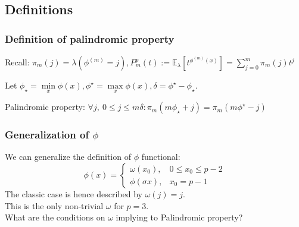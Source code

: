 \subsection{Definitions}
\begin{frame}
    \frametitle{Definition of palindromic property}
    Recall: $\pi_m(j) = \lambda(\phi^{(m)}=j),P_m^p(t):= \mathbb{E}_\lambda\left[ t^{\phi^{(m)}(x)}\right] = \sum\limits_{j=0}^m \pi_m(j) t^j$
    
    Let $\phi_\star = \min\limits_x \phi(x), \phi^\star = \max\limits_x \phi(x), \delta=\phi^\star - \phi_\star$.
    
     Palindromic property: $\forall j,\ 0 \le j \le m\delta:   \pi_m(m\phi_\star + j)=\pi_m(m\phi^\star-j)$
\end{frame}

\begin{frame}
    \frametitle{Generalization of $\phi$}
    We can generalize the definition of $\phi$ functional:
    $$
    \phi(x) = \begin{cases}
                    \omega(x_0), & 0 \le x_0 \le p - 2 \\
                    \phi(\sigma x), & x_0 = p - 1
                \end{cases}
    $$
    The classic case is hence described by $\omega(j)=j$.\\
    This is the only non-trivial $\omega$ for $p=3$.\\
    What are the conditions on $\omega$ implying to Palindromic property?
\end{frame}


